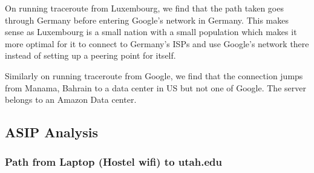 On running traceroute from Luxembourg, we find that the path taken goes through Germany before entering Google's network in Germany.
This makes sense as Luxembourg is a small nation with a small population which makes it more optimal for it to connect to Germany's 
ISPs and use Google's network there instead of setting up a peering point for itself.

Similarly on running traceroute from Google, we find that the connection jumps from Manama, Bahrain to a data center in US but not one 
of Google. The server belongs to an Amazon Data center.

\subsection*{ASIP Analysis}
\subsubsection*{Path from Laptop (Hostel wifi) to utah.edu}
